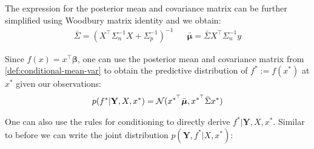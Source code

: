 The expression for the posterior mean and covariance matrix can be further simplified using Woodbury matrix identity
and we obtain:
\begin{align}\label{def:conditional-mean-var}
    \bar{\Sigma} = (X^{\top}\Sigma_n^{-1}X + \Sigma_p^{-1})^{-1} & & \bar{\boldsymbol{\mu}} = \bar{\Sigma} X^{\top} \Sigma_n^{-1} y
\end{align}

Since $f(x) = x^{\top}\boldsymbol{\beta}$, one can use the posterior mean and covariance matrix from
\ref{def:conditional-mean-var} to obtain the predictive distribution of $f^{\ast} := f(x^{\ast})$ at $x^{\ast}$
given our observations:
\begin{align}\label{def:predictive-dist}
    p(f^{\ast} | \mathbf{Y}, X, x^{\ast}) = \operatorname{\mathcal{N}}(x^{\ast^{\top}} \bar{\boldsymbol{\mu}}, x^{\ast^{\top}} \bar{\Sigma} x^{\ast}) \\
\end{align}

One can also use the rules for conditioning to directly derive $f^{\ast} | \mathbf{Y}, X, x^{\ast}$.
Similar to before we can write the joint distribution $p(\mathbf{Y}, f^{\ast}| X, x^{\ast})$:

